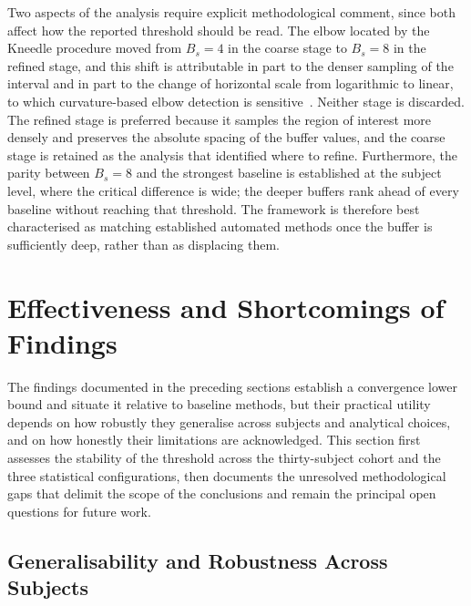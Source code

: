 \documentclass[MScCS,12pt,oneside,final]{uccthesis}
\begin{document}
Two aspects of the analysis require explicit methodological comment, since both affect how the reported threshold should be read. The elbow located by the Kneedle procedure moved from $B_s = 4$ in the coarse stage to $B_s = 8$ in the refined stage, and this shift is attributable in part to the denser sampling of the interval and in part to the change of horizontal scale from logarithmic to linear, to which curvature-based elbow detection is sensitive~\parencite{satopaa2011finding}. Neither stage is discarded. The refined stage is preferred because it samples the region of interest more densely and preserves the absolute spacing of the buffer values, and the coarse stage is retained as the analysis that identified where to refine. Furthermore, the parity between $B_s = 8$ and the strongest baseline is established at the subject level, where the critical difference is wide; the deeper buffers rank ahead of every baseline without reaching that threshold. The framework is therefore best characterised as matching established automated methods once the buffer is sufficiently deep, rather than as displacing them.

\section{Effectiveness and Shortcomings of Findings}
\label{sec:effectiveness_shortcomings}

The findings documented in the preceding sections establish a convergence lower bound and situate it relative to baseline methods, but their practical utility depends on how robustly they generalise across subjects and analytical choices, and on how honestly their limitations are acknowledged. This section first assesses the stability of the threshold across the thirty-subject cohort and the three statistical configurations, then documents the unresolved methodological gaps that delimit the scope of the conclusions and remain the principal open questions for future work.

    \subsection{Generalisability and Robustness Across Subjects}
    \label{subsec:generalisability}
\end{document}
